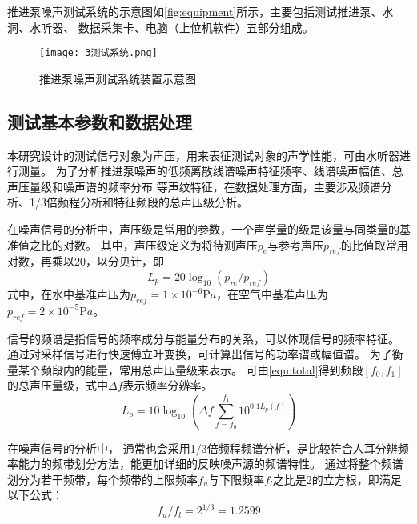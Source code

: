 推进泵噪声测试系统的示意图如\autoref{fig:equipment}所示，主要包括测试推进泵、水洞、水听器、
数据采集卡、电脑（上位机软件）五部分组成。
\begin{figure}[htbp]
    \centering
    \texttt{[image: 3测试系统.png]}
    \caption{\label{fig:equipment}推进泵噪声测试系统装置示意图}
\end{figure}

\subsection{测试基本参数和数据处理}
本研究设计的测试信号对象为声压，用来表征测试对象的声学性能，可由水听器进行测量。
为了分析推进泵噪声的低频离散线谱噪声特征频率、线谱噪声幅值、总声压量级和噪声谱的频率分布
等声纹特征，在数据处理方面，主要涉及频谱分析、1/3倍频程分析和特征频段的总声压级分析。

在噪声信号的分析中，声压级是常用的参数，一个声学量的级是该量与同类量的基准值之比的对数。
其中，声压级定义为将待测声压$p_e$与参考声压$p_{ref}$的比值取常用对数，再乘以20，以分贝计，即
\begin{equation}
    \label{equ:p}
    L_{p} = 20\log_{10}{\left(p_{re}/p_{ref}\right )}
\end{equation}
式中，在水中基准声压为$p_{ref}= 1\times 10^{-6} \mathrm{P} a$，在空气中基准声压为$p_{ref}= 2\times 10^{-5} \mathrm{P} a$。
\begin{comment}
同理，振动加速度级也定义为加速度有效值$a_e$与基准加速度$a_{ref}$之比的以10为底的对数，再乘以20，以分贝计，即
\begin{equation}
    \label{equ:a}
    L_{a} = 20\log_{10}{\left(a_{re}/a_{ref}\right )}
\end{equation}
式中，基准加速度值为$a_{ref}= 1\times 10^{-6} \mathrm{m/s^2} $。
\end{comment}
信号的频谱是指信号的频率成分与能量分布的关系，可以体现信号的频率特征。
通过对采样信号进行快速傅立叶变换，可计算出信号的功率谱或幅值谱。
为了衡量某个频段内的能量，常用总声压量级来表示。
可由\autoref{equ:total}得到频段$\left [ f_0,f_1 \right ]$的总声压量级，式中$\Delta f$表示频率分辨率\cite{}。
\begin{equation}
    \label{equ:total}
    L_p=10\log_{10}{\left (\Delta f \sum_{f=f_0}^{f_1}10^{0.1L_p\left ( f \right )}    \right )  } 
\end{equation}

在噪声信号的分析中，
通常也会采用1/3倍频程频谱分析，是比较符合人耳分辨频率能力的频带划分方法，能更加详细的反映噪声源的频谱特性。
通过将整个频谱划分为若干频带，每个频带的上限频率$f_u$与下限频率$f_l$之比是2的立方根，即满足以下公式：
\begin{equation}
    \label{equ:fu}
    f_{u}/f_{l}=2^{1/3}=1.2599
\end{equation}

